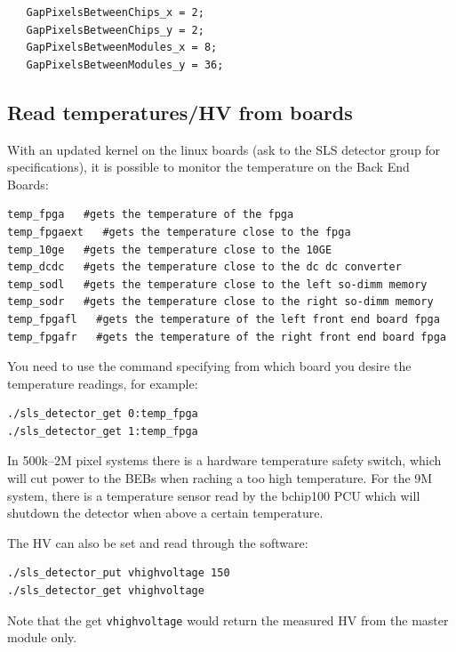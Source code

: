\documentclass{article}
\begin{document}
 \begin{verbatim}
   GapPixelsBetweenChips_x = 2;
   GapPixelsBetweenChips_y = 2;
   GapPixelsBetweenModules_x = 8;
   GapPixelsBetweenModules_y = 36;
 \end{verbatim}

\subsection{Read temperatures/HV from boards}

With an updated kernel on the linux boards (ask to the SLS detector group for specifications), it is possible to monitor the temperature on the Back End Boards: 
\begin{verbatim}
temp_fpga   #gets the temperature of the fpga
temp_fpgaext   #gets the temperature close to the fpga
temp_10ge   #gets the temperature close to the 10GE
temp_dcdc   #gets the temperature close to the dc dc converter
temp_sodl   #gets the temperature close to the left so-dimm memory
temp_sodr   #gets the temperature close to the right so-dimm memory
temp_fpgafl   #gets the temperature of the left front end board fpga
temp_fpgafr   #gets the temperature of the right front end board fpga

\end{verbatim}

You need to use the command specifying from which board you desire the temperature readings, for example:
\begin{verbatim}
./sls_detector_get 0:temp_fpga
./sls_detector_get 1:temp_fpga
\end{verbatim}
In 500k--2M pixel systems there is a hardware temperature safety switch, which will cut power to the BEBs when raching a too high temperature. For the 9M system, there is a temperature sensor read by the bchip100 PCU which will shutdown the detector when above a certain temperature.
 
The HV can also be set and read through the software:
\begin{verbatim}
./sls_detector_put vhighvoltage 150
./sls_detector_get vhighvoltage 
\end{verbatim}
Note that the get {\tt{vhighvoltage}} would return the measured HV from the master module only.

\appendix
\end{document}
